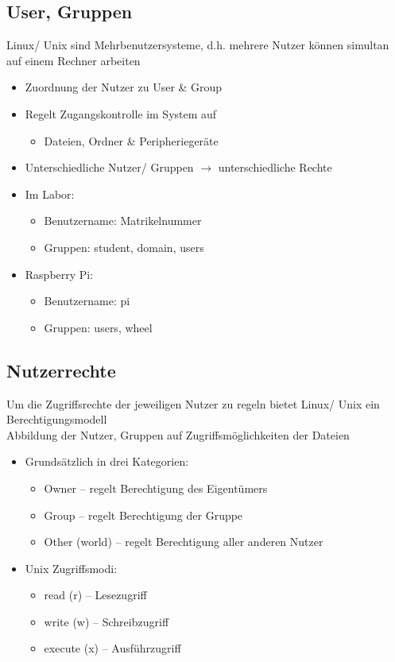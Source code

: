 \documentclass[xcolor=dvipsnames,aspectratio=169]{beamer}
\begin{document}
\subsection{User, Gruppen}
\begin{frame}
Linux/ Unix sind Mehrbenutzersysteme, d.h. mehrere Nutzer können simultan auf einem Rechner arbeiten
\begin{itemize}
	\item Zuordnung der Nutzer zu User \& Group
	\item Regelt Zugangskontrolle im System auf
	\begin{itemize}
	\item  Dateien, Ordner \& Peripheriegeräte
	\end{itemize}
	\item Unterschiedliche Nutzer/ Gruppen $\rightarrow$ unterschiedliche Rechte
	\item Im Labor:
	\begin{itemize}
		\item Benutzername: Matrikelnummer
		\item Gruppen: student, domain, users
	\end{itemize}
	\item Raspberry Pi:
	\begin{itemize}
		\item Benutzername: pi
		\item Gruppen: users, wheel
	\end{itemize}
\end{itemize}
\end{frame}

\subsection{Nutzerrechte}
\begin{frame}
Um die Zugriffsrechte der jeweiligen Nutzer zu regeln bietet Linux/ Unix ein Berechtigungsmodell\\
Abbildung der Nutzer, Gruppen auf Zugriffsmöglichkeiten der Dateien
\begin{itemize}
	\item Grundsätzlich in drei Kategorien:
	\begin{itemize}
		\item Owner -- regelt Berechtigung des Eigentümers
		\item Group -- regelt Berechtigung der Gruppe
		\item Other (world) -- regelt Berechtigung aller anderen Nutzer 
	\end{itemize}
	\item Unix Zugriffsmodi:
	\begin{itemize}
		\item read (r) -- Lesezugriff
		\item write (w) -- Schreibzugriff
		\item execute (x) -- Ausführzugriff
	\end{itemize}
\end{itemize}
\end{frame}
\end{document}
